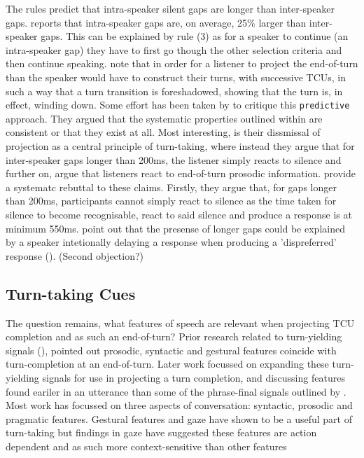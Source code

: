 \documentclass[logo,bsc,singlespacing,parskip]{infthesis}
\begin{document}
The rules predict that intra-speaker silent gaps are longer than inter-speaker gaps. \cite{tenBosch2005} reports that intra-speaker gaps are, on average, 25\% larger than inter-speaker gaps. This can be explained by rule (3) as for a speaker to continue (an intra-speaker gap) they have to first go though the other selection criteria and then continue speaking.
\cite{Sacks1974} note that in order for a listener to project the end-of-turn than the speaker would have to construct their turns, with successive TCUs, in such a way that a turn transition is foreshadowed, showing that the turn is, in effect, winding down. 
Some effort has been taken by \cite{HelEdl2010} to critique this \texttt{predictive} approach. They argued that the systematic properties outlined within \cite{Sacks1974} are consistent or that they exist at all. Most interesting, is their dissmissal of projection as a central principle of turn-taking, where instead they argue that for inter-speaker gaps longer than 200ms, the listener simply reacts to silence and further on, argue that listeners react to end-of-turn prosodic information. \cite{LevTor2015} provide a systematc rebuttal to these claims. Firstly, they argue that, for gaps longer than 200ms, participants cannot simply react to silence as the time taken for silence to become recognisable, react to said silence and produce a response is at minimum 550ms. \cite{Riest2015} point out that the presense of longer gaps could be explained by a speaker intetionally delaying a response when producing a 'dispreferred' response (\cite{Lev1983, KenTor2014}). 
(Second objection?) 

\subsection{Turn-taking Cues}
The question remains, what features of speech are relevant when projecting TCU completion and as such an end-of-turn? Prior research related to turn-yielding signals (\cite{Duncan1972}), pointed out prosodic, syntactic and gestural features coincide with turn-completion at an end-of-turn. Later work focussed on expanding these turn-yielding signals for use in projecting a turn completion, and discussing features found eariler in an utterance than some of the phrase-final signals outlined by \cite{Duncan1972}. Most work has focussed on three aspects of conversation: syntactic, prosodic and pragmatic features. Gestural features \cite{Duncan1972} and gaze \cite{Kendon1967} have shown to be a useful part of turn-taking but findings in gaze have suggested these features are action dependent and as such more context-sensitive than other features \cite{Clayman2013}
\end{document}
